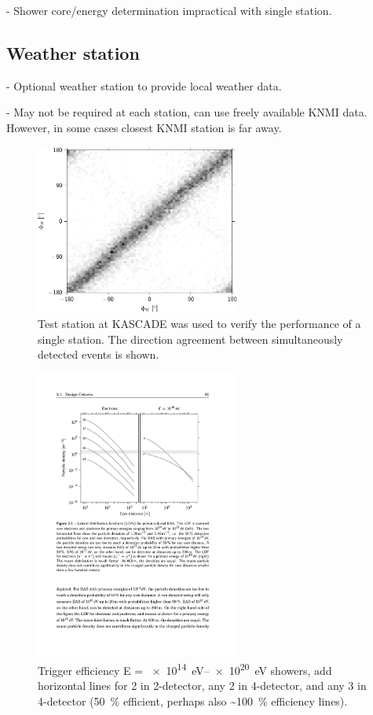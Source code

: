 - Shower core/energy determination impractical with single station.


\subsection{Weather station}


- Optional weather station to provide local weather data.

- May not be required at each station, can use freely available KNMI data. However, in some cases closest KNMI station is far away.



\begin{figure}
    \centering
    \includegraphics[width=0.6\textwidth]
                    {plots/experiment/azimuth_kascade_minn1}
    \caption{Test station at KASCADE was used to verify the performance of a single station. The direction agreement between simultaneously detected events is shown.}
    \label{fig:azimuth_kascade_minn1}
\end{figure}

\begin{figure}
    \centering
    \includegraphics[width=0.6\textwidth]
                    {plots/experiment/ldf_energies}
    \caption{Trigger efficiency E = \SIrange{e14}{e20}{\eV} showers, add horizontal lines for 2 in 2-detector, any 2 in 4-detector, and any 3 in 4-detector (\SI{50}{\percent} efficient, perhaps also \SI{~100}{\percent} efficiency lines).}
    \label{fig:ldf_energies2}
\end{figure}


